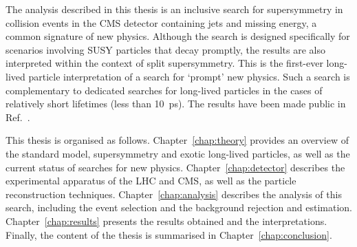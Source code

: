 The analysis described in this thesis is an inclusive search for supersymmetry 
in collision events in the CMS detector containing jets and missing energy, a 
common signature of new physics.
Although the search is designed specifically for scenarios involving SUSY 
particles that decay promptly, the results are also interpreted within the 
context of split supersymmetry. This is the first-ever long-lived particle 
interpretation of a search for `prompt' new physics. 
Such a search is complementary to dedicated searches for long-lived particles 
in the cases of relatively short lifetimes (less than 10~ps). 
The results have been made public in Ref.~\cite{alphat6}.


This thesis is organised as follows. Chapter~\ref{chap:theory} provides an 
overview of the standard model, supersymmetry and exotic long-lived particles, 
as well as the current status of searches for new physics. 
Chapter~\ref{chap:detector} describes the experimental apparatus of the LHC and 
CMS, as well as the particle reconstruction techniques. 
Chapter~\ref{chap:analysis} describes the analysis of this search, including 
the event selection and the background rejection and estimation. 
Chapter~\ref{chap:results} presents the results obtained and the 
interpretations. 
Finally, the content of the thesis is summarised in 
Chapter~\ref{chap:conclusion}.

